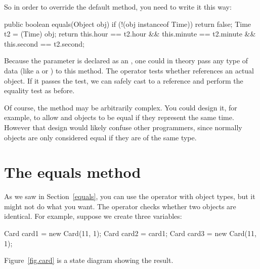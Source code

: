 
So in order to override the default  method, you need to write it this way:

\begin{code}
public boolean equals(Object obj) {
    if (!(obj instanceof Time)) {
        return false;
    }
    Time t2 = (Time) obj;
    return this.hour == t2.hour
        && this.minute == t2.minute
        && this.second == t2.second;
}
\end{code}

Because the parameter is declared as an , one could in theory pass any type of data (like a  or ) to this method.
The  operator tests whether  references an actual  object.
If it passes the test, we can safely cast  to a  reference and perform the equality test as before.

Of course, the  method may be arbitrarily complex.
You could design it, for example, to allow  and  objects to be equal if they represent the same time.
However that design would likely confuse other programmers, since normally objects are only considered equal if they are of the same type.



\section{The equals method}
\label{equivalence}

As we saw in Section~\ref{equals}, you can use the \java{==} operator with object types, but it might not do what you want.
The \java{==} operator checks whether two objects are identical.
For example, suppose we create three  variables:


\begin{code}
Card card1 = new Card(11, 1);
Card card2 = card1;
Card card3 = new Card(11, 1);
\end{code}

Figure~\ref{fig.card} is a state diagram showing the result.

